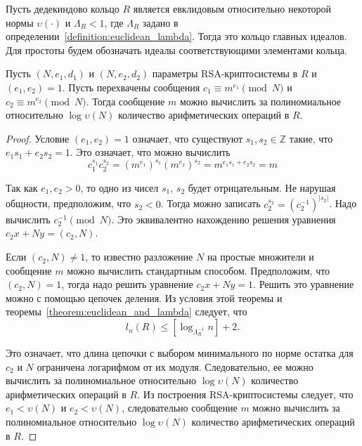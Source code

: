 \documentclass[_00_dissertation.tex]{subfiles}
\begin{document}
\begin{theorem}
    Пусть дедекиндово кольцо $R$ является евклидовым относительно некоторой нормы $\upsilon(\cdot)$ и $\Lambda_{R} < 1$, где $\Lambda_{R}$ задано в определении~\ref{definition:euclidean_lambda}.
    Тогда это кольцо главных идеалов.
    Для простоты будем обозначать идеалы соответствующими элементами кольца.

    Пусть $(N, e_1, d_1)$ и $(N, e_2, d_2)$ параметры RSA-криптосистемы в $R$ и $(e_1, e_2) = 1$.
    Пусть перехвачены сообщения $c_1 \equiv m^{e_1} \pmod{N}$ и $c_2 \equiv m^{e_2} \pmod{N}$.
    Тогда сообщение $m$ можно вычислить за полиномиальное относительно $\log \upsilon(N)$ количество арифметических операций в $R$.
\end{theorem}
\begin{proof}
    Условие $(e_1, e_2) = 1$ означает, что существуют $s_1, s_2 \in \mathbb{Z}$ такие, что $e_1 s_1 + e_2 s_2 = 1$.
    Это означает, что можно вычислить
    \begin{equation*}
        c_1^{s_1}c_2^{s_2} = (m^{e_1})^{s_1} (m^{e_2})^{s_2} = m^{e_1 s_1 + e_2 s_2} = m
    \end{equation*}

    Так как $e_1, e_2 > 0$, то одно из чисел $s_1$, $s_2$ будет отрицательным.
    Не нарушая общности, предположим, что $s_2 < 0$.
    Тогда можно записать $c_2^{s_2} = (c_2^{-1})^{|s_2|}$.
    Надо вычислить $c_2^{-1} \pmod{N}$.
    Это эквивалентно нахождению решения уравнения $c_2 x + N y = (c_2, N)$.

    Если $(c_2, N) \neq 1$, то известно разложение $N$ на простые множители и сообщение $m$ можно вычислить стандартным способом.
    Предположим, что $(c_2, N) = 1$, тогда надо решить уравнение $c_2 x + N y = 1$.
    Решить это уравнение можно с помощью цепочек деления.
    Из условия этой теоремы и теоремы~\ref{theorem:euclidean_and_lambda} следует, что
    \begin{equation*}
        l_{n}(R) \le \left[
            \log_{\Lambda_{R}^{-1}} n
        \right] + 2.
    \end{equation*}

    Это означает, что длина цепочки с выбором минимального по норме остатка для $c_2$ и $N$ ограничена логарифмом от их модуля.
    Следовательно, ее можно вычислить за полиномиальное относительно $\log \upsilon(N)$ количество арифметических операций в $R$.
    Из построения RSA-криптосистемы следует, что $e_1 < \upsilon(N)$ и $e_2 < \upsilon(N)$, следовательно сообщение $m$ можно вычислить за полиномиальное относительно $\log \upsilon(N)$ количество арифметических операций в $R$.
\end{proof}
\end{document}
